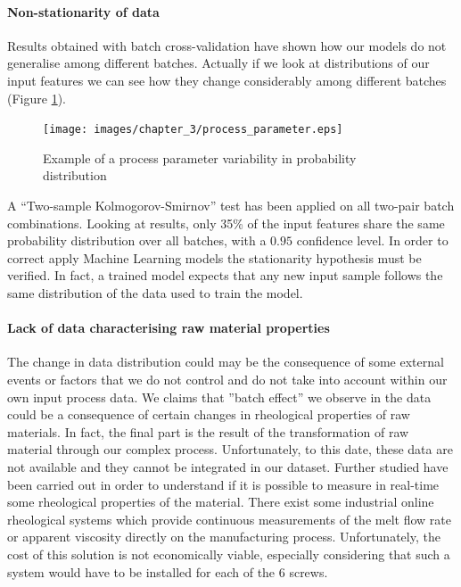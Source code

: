 \paragraph{Non-stationarity of data}

Results obtained with batch cross-validation have shown how our models do not generalise among different batches. Actually if we look at distributions of our input features we can see how they change considerably among different batches (Figure \ref{fig:Example of a process parameter variability in probability distribution}). 
%
\begin{figure}
\centerline{\texttt{[image: images/chapter\_3/process\_parameter.eps]}}
\caption{Example of a process parameter variability in probability distribution}
\label{fig:Example of a process parameter variability in probability distribution}
\end{figure}
%
A “Two-sample Kolmogorov-Smirnov” test has been applied on all two-pair batch combinations. Looking at results, only 35\% of the input features share the same probability distribution over all batches, with a $0.95$ confidence level.
In order to correct apply Machine Learning models the stationarity hypothesis must be verified. In fact, a trained model expects that any new input sample follows the same distribution of the data used to train the model. 

\paragraph{Lack of data characterising raw material properties}

The change in data distribution could may be the consequence of some external events or factors that we do not control and do not take into account within our own input process data. We claims that ''batch effect'' we observe in the data could be a consequence of certain changes in rheological properties of raw materials. In fact, the final part is the result of the transformation of raw material through our complex process. Unfortunately, to this date, these data are not available and they cannot be integrated in our dataset. Further studied have been carried out in order to understand if it is possible to measure in real-time some rheological properties of the material. There exist some industrial online rheological systems which provide continuous measurements of the melt flow rate or apparent viscosity directly on the manufacturing process. Unfortunately, the cost of this solution is not economically viable, especially considering that such a system would have to be installed for each of the 6 screws.

